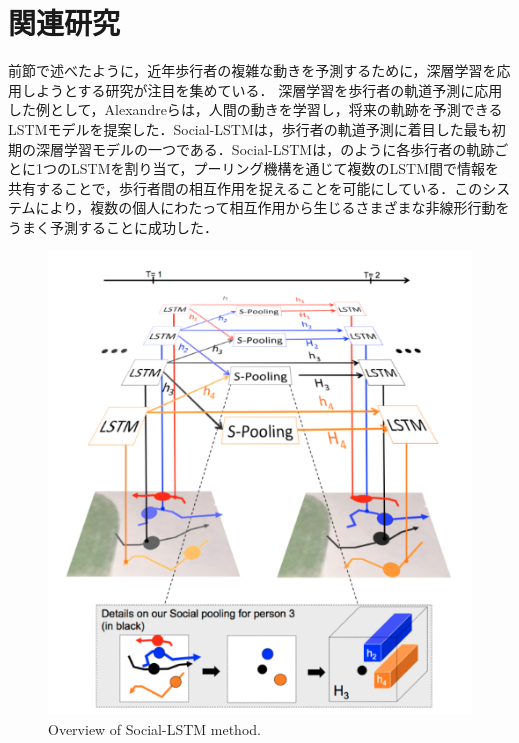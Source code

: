 
\section{関連研究}\label{sec:relate-research}
前節で述べたように，近年歩行者の複雑な動きを予測するために，深層学習を応用しようとする研究が注目を集めている．
深層学習を歩行者の軌道予測に応用した例として，Alexandreら\cite{s-lstm}は，人間の動きを学習し，将来の軌跡を予測できるLSTMモデルを提案した．Social-LSTMは，歩行者の軌道予測に着目した最も初期の深層学習モデルの一つである．Social-LSTMは，のように各歩行者の軌跡ごとに1つのLSTMを割り当て，プーリング機構を通じて複数のLSTM間で情報を共有することで，歩行者間の相互作用を捉えることを可能にしている．このシステムにより，複数の個人にわたって相互作用から生じるさまざまな非線形行動をうまく予測することに成功した．

\vspace{-10pt}

\begin{figure}[hbtp]
     \centering
    \includegraphics[keepaspectratio, scale=0.55]
         {images/s-lstm.png}
    \caption{Overview of Social-LSTM method.\protect\footnotemark[1]}
    \label{Fig:s-lstm}
\end{figure}
\protect{}

